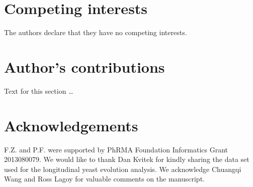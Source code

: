 \documentclass{bmcart}
\begin{document}
\begin{backmatter}

\section*{Competing interests}
  The authors declare that they have no competing interests.

\section*{Author's contributions}
    Text for this section \ldots

\section*{Acknowledgements}
F.Z. and P.F. were supported by PhRMA Foundation Informatics Grant 2013080079.
We would like to thank Dan Kvitek for kindly sharing the data set used for the longitudinal yeast evolution analysis.
We acknowledge Chuangqi Wang and Ross Lagoy for valuable comments on the manuscript.





\end{backmatter}
\end{document}

